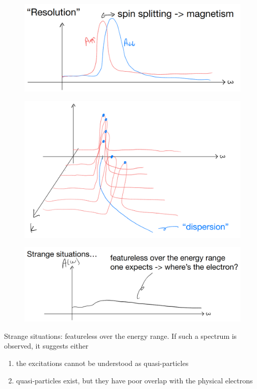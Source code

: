 \begin{figure}[ht]
    \centering
    \includegraphics[width=\textwidth]{jupyterbook/data/fig/lec05-fig07.png}
\end{figure}

\begin{figure}[ht]
    \centering
    \includegraphics[width=\textwidth]{jupyterbook/data/fig/lec05-fig08.png}
\end{figure}

\begin{figure}[ht]
    \centering
    \includegraphics[width=\textwidth]{jupyterbook/data/fig/lec05-fig09.png}
\end{figure}

Strange situations: featureless over the energy range. If such a spectrum is observed, it suggests either
\begin{enumerate}
    \item the excitations cannot be understood as quasi-particles
    \item quasi-particles exist, but they have poor overlap with the physical electrons
\end{enumerate}

